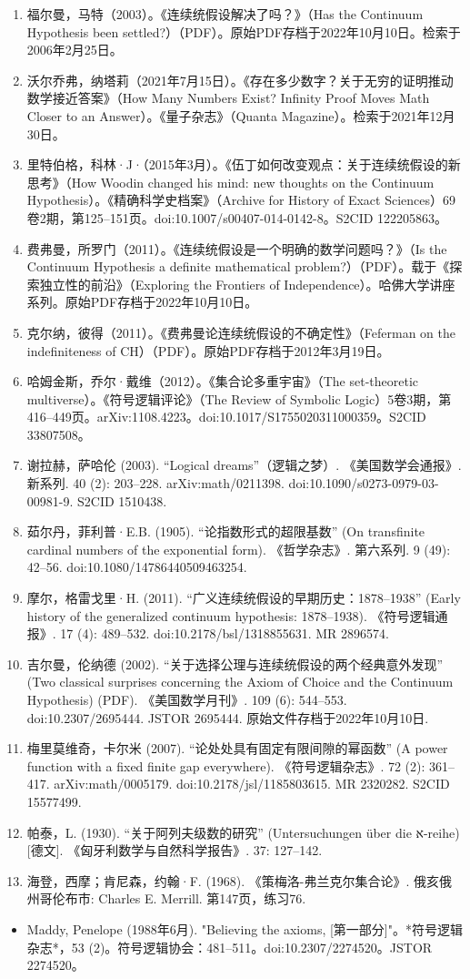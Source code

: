\begin{enumerate}
\item 福尔曼，马特（2003）。《连续统假设解决了吗？》（Has the Continuum Hypothesis been settled?）（PDF）。原始PDF存档于2022年10月10日。检索于2006年2月25日。
\item 沃尔乔弗，纳塔莉（2021年7月15日）。《存在多少数字？关于无穷的证明推动数学接近答案》（How Many Numbers Exist? Infinity Proof Moves Math Closer to an Answer）。《量子杂志》（Quanta Magazine）。检索于2021年12月30日。
\item 里特伯格，科林·J·（2015年3月）。《伍丁如何改变观点：关于连续统假设的新思考》（How Woodin changed his mind: new thoughts on the Continuum Hypothesis）。《精确科学史档案》（Archive for History of Exact Sciences）69卷2期，第125–151页。doi:10.1007/s00407-014-0142-8。S2CID 122205863。
\item 费弗曼，所罗门（2011）。《连续统假设是一个明确的数学问题吗？》（Is the Continuum Hypothesis a definite mathematical problem?）（PDF）。载于《探索独立性的前沿》（Exploring the Frontiers of Independence）。哈佛大学讲座系列。原始PDF存档于2022年10月10日。
\item 克尔纳，彼得（2011）。《费弗曼论连续统假设的不确定性》（Feferman on the indefiniteness of CH）（PDF）。原始PDF存档于2012年3月19日。
\item 哈姆金斯，乔尔·戴维（2012）。《集合论多重宇宙》（The set-theoretic multiverse）。《符号逻辑评论》（The Review of Symbolic Logic）5卷3期，第416–449页。arXiv:1108.4223。doi:10.1017/S1755020311000359。S2CID 33807508。
\item 谢拉赫，萨哈伦 (2003). “Logical dreams”（逻辑之梦）. 《美国数学会通报》. 新系列. 40 (2): 203–228. arXiv:math/0211398. doi:10.1090/s0273-0979-03-00981-9. S2CID 1510438.
\item 茹尔丹，菲利普·E.B. (1905). “论指数形式的超限基数” (On transfinite cardinal numbers of the exponential form). 《哲学杂志》. 第六系列. 9 (49): 42–56. doi:10.1080/14786440509463254.
\item 摩尔，格雷戈里·H. (2011). “广义连续统假设的早期历史：1878–1938” (Early history of the generalized continuum hypothesis: 1878–1938). 《符号逻辑通报》. 17 (4): 489–532. doi:10.2178/bsl/1318855631. MR 2896574.
\item 吉尔曼，伦纳德 (2002). “关于选择公理与连续统假设的两个经典意外发现” (Two classical surprises concerning the Axiom of Choice and the Continuum Hypothesis) (PDF). 《美国数学月刊》. 109 (6): 544–553. doi:10.2307/2695444. JSTOR 2695444. 原始文件存档于2022年10月10日.
\item 梅里莫维奇，卡尔米 (2007). “论处处具有固定有限间隙的幂函数” (A power function with a fixed finite gap everywhere). 《符号逻辑杂志》. 72 (2): 361–417. arXiv:math/0005179. doi:10.2178/jsl/1185803615. MR 2320282. S2CID 15577499.
\item 帕泰，L. (1930). “关于阿列夫级数的研究” (Untersuchungen über die א-reihe) [德文]. 《匈牙利数学与自然科学报告》. 37: 127–142.
\item 海登，西摩；肯尼森，约翰·F. (1968). 《策梅洛-弗兰克尔集合论》. 俄亥俄州哥伦布市: Charles E. Merrill. 第147页，练习76.
\end{enumerate}
\begin{itemize}
\item Maddy, Penelope (1988年6月). "Believing the axioms, [第一部分]"。*符号逻辑杂志*，53 (2)。符号逻辑协会：481–511。doi:10.2307/2274520。JSTOR 2274520。
\end{itemize}